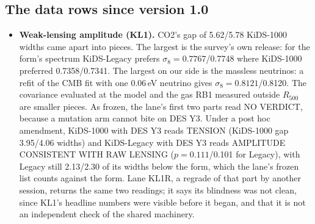 \documentclass[10pt]{article}
\begin{document}
\subsection{The data rows since version 1.0}
\begin{itemize}
\item \textbf{Weak-lensing amplitude (KL1).} CO2's gap of 5.62/5.78 KiDS-1000 widths came apart into pieces. The largest is the survey's own release: for the form's spectrum KiDS-Legacy prefers $\sigma_8=0.7767$/0.7748 where KiDS-1000 preferred 0.7358/0.7341. The largest on our side is the massless neutrinos: a refit of the CMB fit with one 0.06\,eV neutrino gives $\sigma_8=0.8121$/0.8120. The covariance evaluated at the model and the gas RB1 measured outside $R_{500}$ are smaller pieces. As frozen, the lane's first two parts read NO VERDICT, because a mutation arm cannot bite on DES Y3. Under a post hoc amendment, KiDS-1000 with DES Y3 reads TENSION (KiDS-1000 gap 3.95/4.06 widths) and KiDS-Legacy with DES Y3 reads AMPLITUDE CONSISTENT WITH RAW LENSING ($p=0.111$/0.101 for Legacy), with Legacy still 2.13/2.30 of its widths below the form, which the lane's frozen list counts against the form. Lane KL1R, a regrade of that part by another session, returns the same two readings; it says its blindness was not clean, since KL1's headline numbers were visible before it began, and that it is not an independent check of the shared machinery.

\end{itemize}
\end{document}
